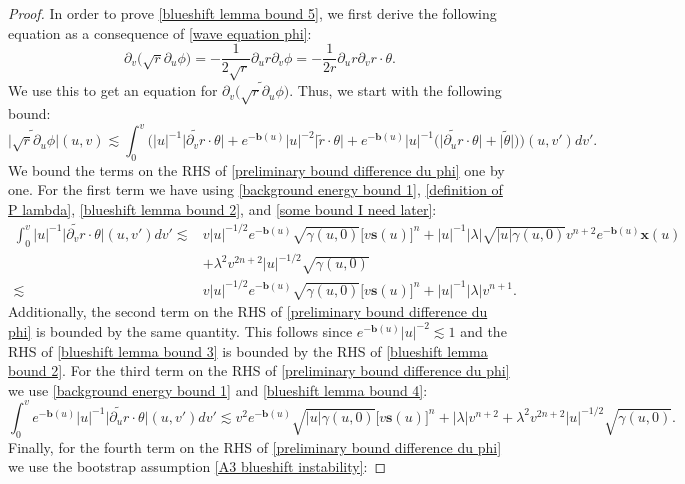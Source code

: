 \documentclass[11pt]{article}
\numberwithin{equation}{section}
\begin{document}
\begin{proof}
    In order to prove \eqref{blueshift lemma bound 5}, we first derive the following equation as a consequence of \eqref{wave equation phi}:
    \[\partial_v\big(\sqrt{r}\partial_u\phi\big)=-\frac{1}{2\sqrt{r}}\partial_ur\partial_v\phi=-\frac{1}{2r}\partial_ur\partial_vr\cdot\theta.\]
    We use this to get an equation for $\partial_v\big(\widetilde{\sqrt{r}\partial_u\phi}\big)$. Thus, we start with the following bound:
    \begin{equation}\label{preliminary bound difference du phi}
        \big|\widetilde{\sqrt{r}\partial_u\phi}\big|(u,v)\lesssim\int_0^v\bigg(|u|^{-1}\big|\widetilde{\partial_vr}\cdot\theta\big|+e^{-\mathbf{b}(u)}|u|^{-2}\big|\widetilde{r}\cdot\theta\big|+e^{-\mathbf{b}(u)}|u|^{-1}\Big(\big|\widetilde{\partial_ur}\cdot\theta\big|+\big|\widetilde{\theta}\big|\Big)\bigg)(u,v')dv'.
    \end{equation}
    We bound the terms on the RHS of \eqref{preliminary bound difference du phi} one by one. For the first term we have using \eqref{background energy bound 1}, \eqref{definition of P lambda}, \eqref{blueshift lemma bound 2}, and \eqref{some bound I need later}:
    \begin{align*}
        \int_0^v|u|^{-1}\big|\widetilde{\partial_vr}\cdot\theta\big|(u,v')dv'\lesssim &v|u|^{-1/2}e^{-\mathbf{b}(u)}\sqrt{\gamma(u,0)}\big[v\mathbf{s}(u)\big]^{n}+|u|^{-1}|\lambda|\sqrt{|u|\gamma(u,0)}v^{n+2}e^{-\mathbf{b}(u)}\mathbf{x}(u)\\
        &+\lambda^2v^{2n+2}|u|^{-1/2}\sqrt{\gamma(u,0)}\\
        \lesssim &v|u|^{-1/2}e^{-\mathbf{b}(u)}\sqrt{\gamma(u,0)}\big[v\mathbf{s}(u)\big]^{n}+|u|^{-1}|\lambda|v^{n+1}.
    \end{align*}
    Additionally, the second term on the RHS of \eqref{preliminary bound difference du phi} is bounded by the same quantity. This follows since $e^{-\mathbf{b}(u)}|u|^{-2}\lesssim1$ and the RHS of \eqref{blueshift lemma bound 3} is bounded by the RHS of \eqref{blueshift lemma bound 2}. For the third term on the RHS of \eqref{preliminary bound difference du phi} we use \eqref{background energy bound 1} and \eqref{blueshift lemma bound 4}:
    \begin{equation*}
        \int_0^ve^{-\mathbf{b}(u)}|u|^{-1}\big|\widetilde{\partial_ur}\cdot\theta\big|(u,v')dv'\lesssim v^2e^{-\mathbf{b}(u)}\sqrt{|u|\gamma(u,0)}\big[v\mathbf{s}(u)\big]^{n}+|\lambda|v^{n+2}+\lambda^2v^{2n+2}|u|^{-1/2}\sqrt{\gamma(u,0)}.
    \end{equation*}
    Finally, for the fourth term on the RHS of \eqref{preliminary bound difference du phi} we use the bootstrap assumption \eqref{A3 blueshift instability}:

\end{proof}
\end{document}
